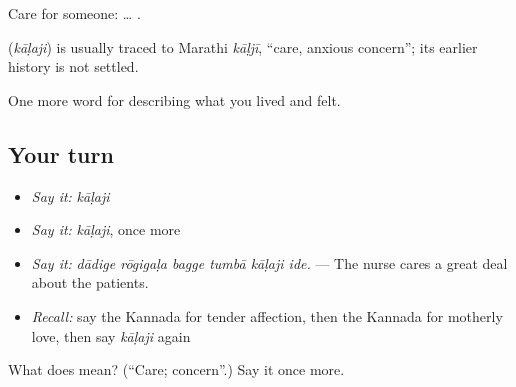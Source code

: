 Care for someone: …  .

\begin{cousinweb}
\textbf{} (\emph{kāḷaji}) is usually traced to Marathi \emph{kāḷjī}, \textquotedblleft{}care, anxious concern\textquotedblright{}; its earlier history is not settled.
\end{cousinweb}

\begin{grammarlens}[title={What you've built}]
One more word for describing what you lived and felt.
\end{grammarlens}

\subsection*{Your turn}
\begin{itemize}
\raggedright
  \item \emph{Say it:} \emph{kāḷaji}
  \item \emph{Say it:} \emph{kāḷaji}, once more
  \item \emph{Say it:} \emph{dādige rōgigaḷa bagge tumbā kāḷaji ide.} — The nurse cares a great deal about the patients.
  \item \emph{Recall:} say the Kannada for tender affection, then the Kannada for motherly love, then say \emph{kāḷaji} again
\end{itemize}

\begin{tcolorbox}[breakable,colback=teal!4,colframe=teal!35!black,title={Before you move on}]
What does  mean? (\textquotedblleft{}Care; concern\textquotedblright{}.) Say it once more.
\end{tcolorbox}
